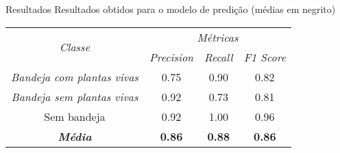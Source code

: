 \begin{frame}[t]{Resultados}
    Resultados obtidos para o modelo de predição (médias em negrito)
    \begin{table}[]
        \centering
        \begin{tabular}{cccc}
        \hline
        \multirow{2}{*}{\textit{Classe}}   & \multicolumn{3}{c}{\textit{Métricas}}                    \\ \cline{2-4} 
                                        & \textit{Precision} & \textit{Recall} & \textit{F1 Score} \\ \hline
        \textit{Bandeja com plantas vivas} & 0.75               & 0.90            & 0.82              \\
        \textit{Bandeja sem plantas vivas} & 0.92               & 0.73            & 0.81              \\
        Sem bandeja                        & 0.92               & 1.00            & 0.96              \\
        \textit{\textbf{Média}}            & \textbf{0.86}      & \textbf{0.88}   & \textbf{0.86}     \\ \hline
        \end{tabular}
    \end{table}
\end{frame}